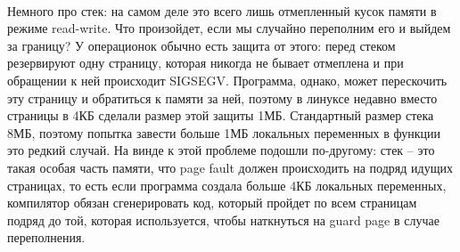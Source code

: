 \documentclass[12pt, a4paper]{article}
\begin{document}
	\\\par Немного про стек: на самом деле это всего лишь отмепленный кусок памяти в режиме read-write. Что произойдет, если мы случайно переполним его и выйдем за границу? У операционок обычно есть защита от этого: перед стеком резервируют одну страницу, которая никогда не бывает отмеплена и при обращении к ней происходит SIGSEGV. Программа, однако, может перескочить эту страницу и обратиться к памяти за ней, поэтому в линуксе недавно вместо страницы в 4КБ сделали размер этой защиты 1МБ. Стандартный размер стека 8МБ, поэтому попытка завести больше 1МБ локальных переменных в функции это редкий случай. На винде к этой проблеме подошли по-другому: стек -- это такая особая часть памяти, что page fault должен происходить на подряд идущих страницах, то есть если программа создала больше 4КБ локальных переменных, компилятор обязан сгенерировать код, который пройдет по всем страницам подряд до той, которая используется, чтобы наткнуться на guard page в случае переполнения.
\end{document}
